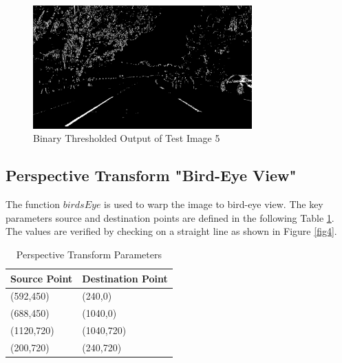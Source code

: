 \documentclass{article}
\begin{document}
\begin{figure}[h!t]
\begin{center}
\includegraphics[width=0.75\textwidth]{../output_images/threshold/v2test5.jpg}
\caption{Binary Thresholded Output of Test Image 5}
\label{fig3}
\end{center}
\end{figure}

\subsection{Perspective Transform "Bird-Eye View"} 
The function $birdsEye$ is used to warp the image to bird-eye view. The key parameters source and destination points are defined in the following Table \ref{table1}. The values are verified by checking on a straight line as shown in Figure \ref{fig4}.\\

\begin{table}[h!t]
  \begin{center}
    \caption{Perspective Transform Parameters}
    \label{table1}
    \begin{tabular}{l|l} %
      \textbf{Source Point} & \textbf{Destination Point}\\
      \hline
      (592,450) & (240,0)\\
      (688,450) & (1040,0)\\
      (1120,720) & (1040,720)\\
      (200,720) & (240,720)\\
    \end{tabular}
  \end{center}
\end{table}
\end{document}
